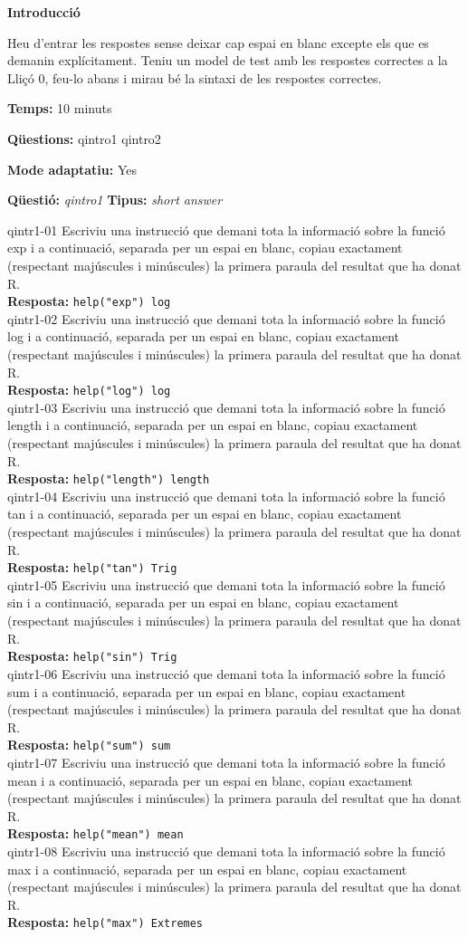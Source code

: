 \documentclass[10pt]{article}
\newcommand{\answer}{\textbf{Resposta: }}
\newcommand{\titletest}[1]{\centerline{\Large\textbf{#1}}\medskip}
\newcommand{\timetest}[1]{\noindent\textbf{Temps:} #1 minuts}
\newcommand{\questionstest}{\noindent\textbf{Qüestions: }}
\newcommand{\adaptativetest}{\noindent\textbf{Mode adaptatiu: }}
\newcommand{\newquestion}[2]{\noindent\textbf{Qüestió: }\emph{#1} \textbf{Tipus: }\emph{#2}\medskip}
\newenvironment{introtest}{}{\newpage}
\newcommand{\namequestion}{}
\begin{document}
\begin{introtest}
\titletest{Introducció}

Heu d'entrar les respostes sense deixar cap espai en blanc excepte els que es demanin explícitament.  Teniu un model de test amb les respostes correctes a la Lliçó 0, feu-lo abans i mirau bé la sintaxi de les respostes correctes.  

\timetest{10}

\questionstest qintro1 qintro2

\adaptativetest Yes
\end{introtest}

\newquestion{qintro1}{short answer} 
\def\qintro1#1{Escriviu una instrucció que demani tota la informació sobre #1 i a continuació, separada per un espai en blanc, copiau exactament (respectant majúscules i minúscules) la primera paraula del resultat que ha donat R.}

\namequestion{qintr1-01}
\qintro1{la funció exp}\\ 
\answer{\verb?help("exp") log?}\\

\namequestion{qintr1-02}
\qintro1{la funció log}\\ 
\answer{\verb?help("log") log?}\\

\namequestion{qintr1-03}
\qintro1{la funció length}\\ 
\answer{\verb?help("length") length?}\\

\namequestion{qintr1-04}
\qintro1{la funció tan}\\ 
\answer{\verb?help("tan") Trig?}\\

\namequestion{qintr1-05}
\qintro1{la funció sin}\\ 
\answer{\verb?help("sin") Trig?}\\

\namequestion{qintr1-06}
\qintro1{la funció sum}\\ 
\answer{\verb?help("sum") sum?}\\

\namequestion{qintr1-07}
\qintro1{la funció mean}\\ 
\answer{\verb?help("mean") mean?}\\

\namequestion{qintr1-08}
\qintro1{la funció max}\\ 
\answer{\verb?help("max") Extremes?}\\
\end{document}
